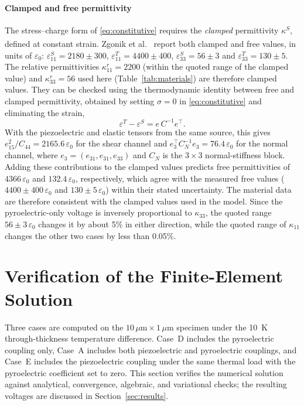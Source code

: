\documentclass[a4paper, 11pt, twoside]{article}
\newcommand{\supercite}[1]{\!\!\textsuperscript{\cite{#1}}}
\begin{document}
\paragraph{Clamped and free permittivity}
The stress--charge form of \eqref{eq:constitutive} requires the \emph{clamped}
permittivity $\kappa^S$, defined at constant strain. Zgonik et al.\
\supercite{Zgonik1994} report both clamped and free values, in units of $\varepsilon_0$:
$\varepsilon_{11}^S=2180\pm300$, $\varepsilon_{11}^T=4400\pm400$,
$\varepsilon_{33}^S=56\pm3$ and $\varepsilon_{33}^T=130\pm5$. The relative
permittivities $\kappa_{11}^r=2200$ (within the quoted range of the clamped value)
and $\kappa_{33}^r=56$ used here (Table~\ref{tab:materials}) are therefore clamped
values. They can be checked using the thermodynamic identity between free and clamped
permittivity, obtained by setting $\sigma=0$ in \eqref{eq:constitutive} and eliminating
the strain,
\begin{equation}
\varepsilon^T-\varepsilon^S=e\,C^{-1}e^{\!\top}.
\label{eq:dielectric-identity}
\end{equation}
With the piezoelectric and elastic tensors from the same source, this gives
$e_{15}^2/C_{44}=2165.6\,\varepsilon_0$ for the shear channel and
$e_3^{\!\top}C_N^{-1}e_3=76.4\,\varepsilon_0$ for the normal channel, where
$e_3=(e_{31},e_{31},e_{33})$ and $C_N$ is the $3\times3$ normal-stiffness block.
Adding these contributions to the clamped values predicts free permittivities of
$4366\,\varepsilon_0$ and $132.4\,\varepsilon_0$, respectively, which agree with the
measured free values
($4400\pm400\,\varepsilon_0$ and $130\pm5\,\varepsilon_0$) within their stated
uncertainty. The material data are therefore consistent with the clamped values used
in the model. Since the pyroelectric-only voltage is inversely proportional to
$\kappa_{33}$, the quoted range $56\pm3\,\varepsilon_0$ changes it by about 5\% in
either direction, while the quoted range of $\kappa_{11}$ changes the other two cases
by less than 0.05\%.

\section{Verification of the Finite-Element Solution}
\label{sec:verification}

Three cases are computed on the $10\,\mu\text{m}\times1\,\mu\text{m}$ specimen under the
10~K through-thickness temperature difference. Case~D includes the pyroelectric
coupling only, Case~A includes both piezoelectric and pyroelectric couplings, and
Case~E includes the piezoelectric coupling under the same thermal load with the
pyroelectric coefficient set to zero. This section verifies the numerical solution
against analytical, convergence, algebraic, and variational checks; the resulting
voltages are discussed in Section~\ref{sec:results}.
\end{document}
